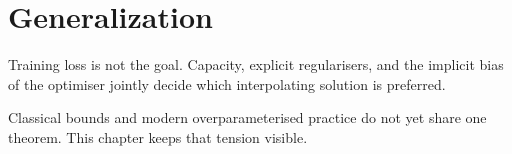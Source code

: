 \chapter{Generalization}
\label{ch:generalization}

Training loss is not the goal. Capacity, explicit regularisers, and the implicit bias of the optimiser jointly decide which interpolating solution is preferred.

Classical bounds and modern overparameterised practice do not yet share one theorem. This chapter keeps that tension visible.
